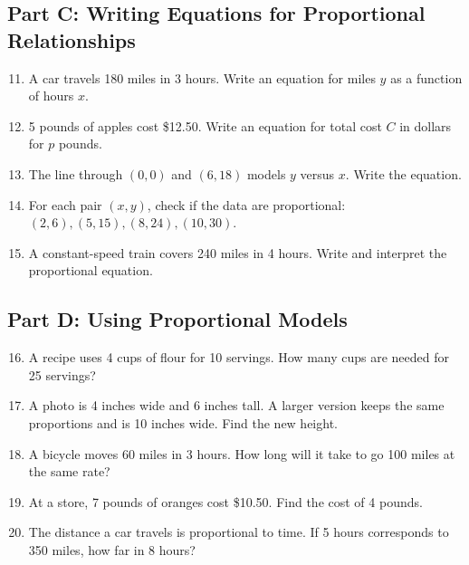 \documentclass[14pt]{extarticle}
\begin{document}
\subsection*{Part C: Writing Equations for Proportional Relationships}
\begin{enumerate}
  \setcounter{enumi}{10}
  \item A car travels 180 miles in 3 hours. Write an equation for miles \(y\) as a function of hours \(x\).
  \item 5 pounds of apples cost \$12.50. Write an equation for total cost \(C\) in dollars for \(p\) pounds.
  \item The line through \((0,0)\) and \((6,18)\) models \(y\) versus \(x\). Write the equation.
  \item For each pair \((x,y)\), check if the data are proportional:  
  \((2,6), (5,15), (8,24), (10,30)\).
  \item A constant-speed train covers 240 miles in 4 hours. Write and interpret the proportional equation.
\end{enumerate}

\subsection*{Part D: Using Proportional Models}
\begin{enumerate}
  \setcounter{enumi}{15}
  \item A recipe uses 4 cups of flour for 10 servings. How many cups are needed for 25 servings?
  \item A photo is 4 inches wide and 6 inches tall. A larger version keeps the same proportions and is 10 inches wide. Find the new height.
  \item A bicycle moves 60 miles in 3 hours. How long will it take to go 100 miles at the same rate?
  \item At a store, 7 pounds of oranges cost \$10.50. Find the cost of 4 pounds.
  \item The distance a car travels is proportional to time. If 5 hours corresponds to 350 miles, how far in 8 hours?
\end{enumerate}
\end{document}
